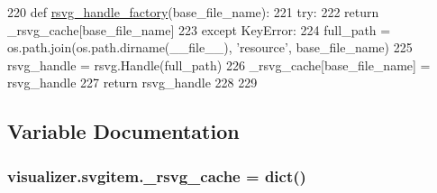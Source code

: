 \begin{DoxyCode}
220 \textcolor{keyword}{def }\hyperlink{namespacevisualizer_1_1svgitem_a4a20231a6caaa935e292a9c2d15b9dff}{rsvg\_handle\_factory}(base\_file\_name):
221     \textcolor{keywordflow}{try}:
222         \textcolor{keywordflow}{return} \_rsvg\_cache[base\_file\_name]
223     \textcolor{keywordflow}{except} KeyError:
224         full\_path = os.path.join(os.path.dirname(\_\_file\_\_), \textcolor{stringliteral}{'resource'}, base\_file\_name)
225         rsvg\_handle = rsvg.Handle(full\_path)
226         \_rsvg\_cache[base\_file\_name] = rsvg\_handle
227         \textcolor{keywordflow}{return} rsvg\_handle
228 
229 \end{DoxyCode}


\subsection{Variable Documentation}
\subsubsection[{\texorpdfstring{\+\_\+rsvg\+\_\+cache}{_rsvg_cache}}]{\setlength{\rightskip}{0pt plus 5cm}visualizer.\+svgitem.\+\_\+rsvg\+\_\+cache = dict()\hspace{0.3cm}{\ttfamily [private]}}\hypertarget{namespacevisualizer_1_1svgitem_aa7227bb100255d356be9683eadb0c0ab}{}\label{namespacevisualizer_1_1svgitem_aa7227bb100255d356be9683eadb0c0ab}
